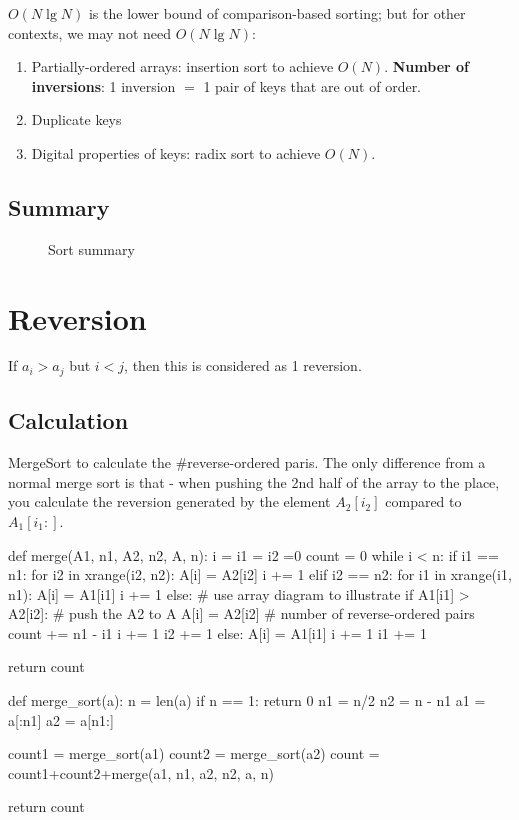 $O(N\lg N)$ is the lower bound of comparison-based sorting; but for other
contexts, we may not need $O(N \lg N)$:
\begin{enumerate}
\item Partially-ordered arrays: insertion sort to achieve $O(N)$. \textbf{Number of inversions}: 1 inversion $=$ 1 pair of keys that are out
of order.
\item Duplicate keys
\item Digital properties of keys: radix sort to achieve $O(N)$.
\end{enumerate}

\subsection{Summary}
\begin{figure}[hbtp]
\centering
{}
\caption{Sort summary}
\label{fig:trie} 
\end{figure}


\section{Reversion}
If $a_i > a_j$ but $i<j$, then this is considered as 1 reversion. 

\subsection{Calculation}
MergeSort to calculate the \#reverse-ordered paris. The only difference from a normal
merge sort is that - when pushing the 2nd half of the array to the place, you calculate
the reversion generated by the element $A_2[i_2]$ compared to $A_1[i_1:]$.

\begin{python}
def merge(A1, n1, A2, n2, A, n):
    i = i1 = i2 =0
    count = 0
    while i < n:
        if i1 == n1:
            for i2 in xrange(i2, n2):
                A[i] = A2[i2]
                i += 1
        elif i2 == n2:
            for i1 in xrange(i1, n1):
                A[i] = A1[i1]
                i += 1
        else:
            # use array diagram to illustrate
            if A1[i1] > A2[i2]:  # push the A2 to A
                A[i] = A2[i2]
                # number of reverse-ordered pairs
                count += n1 - i1
                i += 1
                i2 += 1
            else:
                A[i] = A1[i1]
                i += 1
                i1 += 1

    return count

def merge_sort(a):
    n = len(a)
    if n == 1:
        return 0
    n1 = n/2
    n2 = n - n1
    a1 = a[:n1]
    a2 = a[n1:]

    count1 = merge_sort(a1)
    count2 = merge_sort(a2)
    count = count1+count2+merge(a1, n1, a2, n2, a, n)

    return count
\end{python}

